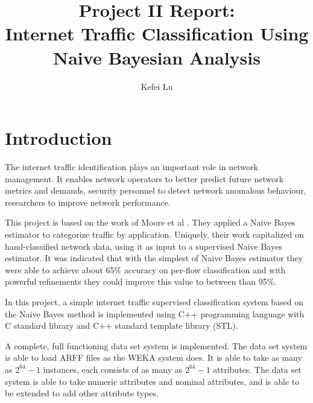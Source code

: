 \documentclass[a4paper,12pt]{article}
\author{Kefei Lu}
\title{Project II Report:\\Internet Traffic Classification Using Naive Bayesian Analysis}
\begin{document}
\maketitle
\tableofcontents
\newpage

\section{Introduction}
The internet traffic identification plays an important role in network management. It enables network operators to better predict future network metrics and demands, security personnel to detect network anomalous behaviour, researchers to improve network performance.


This project is based on the work of Moore et al \cite{moore2005itc}. They applied a Naive Bayes estimator to categorize traffic by application. Uniquely, their work capitalized on hand-classified network data, using it as input to a supervised Naive Bayes estimator. It was indicated that with the simplest of Naive Bayes estimator they were able to achieve about 65\% accuracy on per-flow classification and with powerful refinements they could improve this value to between than 95\%.

In this project, a simple internet traffic supervised classification system based on the Naive Bayes method \cite{moore2005itc} is implemented using C++ programming language with C standard library and C++ standard template library (STL). 

A complete, full functioning data set system is implemented. The data set system is able to load ARFF files as the WEKA system does. It is able to take as many as $2^{64}-1$ instances, each consists of as many as $2^{64}-1$ attributes. The data set system is able to take numeric attributes and nominal attributes, and is able to be extended to add other attribute types. 
\end{document}
